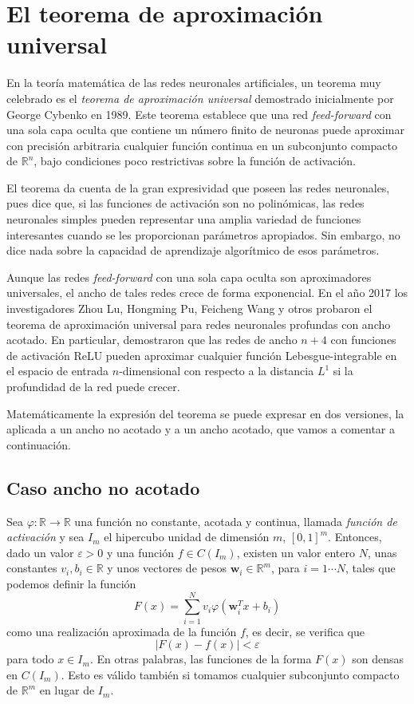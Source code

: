 \documentclass[
  a4paper,
  12pt,
  spanish,
]{scrartcl}
\theoremstyle{teorema-style}
\begin{document}
\section{El teorema de aproximación universal}
\label{sec:teorema}

En la teoría matemática de las redes neuronales artificiales, un teorema muy celebrado es el \textit{teorema de aproximación universal} demostrado inicialmente por George Cybenko en 1989. Este teorema establece que una red \textit{feed-forward} con una sola capa oculta que contiene un número finito de neuronas puede aproximar con precisión arbitraria cualquier función continua en un subconjunto compacto de $\mathbb{R}^n$, bajo condiciones poco restrictivas sobre la función de activación.

El teorema da cuenta de la gran expresividad que poseen las redes neuronales, pues dice que, si las funciones de activación son no polinómicas, las redes neuronales simples pueden representar una amplia variedad de funciones interesantes cuando se les proporcionan parámetros apropiados. Sin embargo, no dice nada sobre la capacidad de aprendizaje algorítmico de esos parámetros.

Aunque las redes \textit{feed-forward} con una sola capa oculta son aproximadores universales, el ancho de tales redes crece de forma exponencial. En el año 2017 los investigadores Zhou Lu, Hongming Pu, Feicheng Wang y otros \parencite{lu_expressive_2017} probaron el teorema de aproximación universal para redes neuronales profundas con ancho acotado. En particular, demostraron que las redes de ancho $n + 4$ con funciones de activación ReLU pueden aproximar cualquier función Lebesgue-integrable en el espacio de entrada $n$-dimensional con respecto a la distancia $L^{1}$ si la profundidad de la red puede crecer.

Matemáticamente la expresión del teorema se puede expresar en dos versiones, la aplicada a un ancho no acotado y a un ancho acotado, que vamos a comentar a continuación.

\subsection{Caso ancho no acotado}

Sea $\varphi:\mathbb{R} \rightarrow \mathbb{R}$ una función no constante, acotada y continua, llamada \textit{función de activación} y sea $I_m$ el hipercubo unidad de dimensión $m$, $[0,1]^m$.
Entonces, dado un valor $\varepsilon > 0$ y una función $f \in C(I_m)$, existen un valor entero $N$, unas constantes $v_i , b_i \in \mathbb{R}$ y unos vectores de pesos $\pmb{w}_i \in \mathbb{R}^m$, para $i =1 \cdots N$, tales que podemos definir la función
\[
  F (x) = \sum_{{i = 1}}^{{N}} v_{i} \varphi \left (\pmb w_ {i} ^ {T} x + b_ {i} \right)
\]
como una realización aproximada de la función $f$, es decir, se verifica que
\[
  |F(x)-f(x)| < \varepsilon
\]
para todo \(x \in I_m\).
En otras palabras, las funciones de la forma $F(x)$ son densas en $C(I_m)$.
Esto es válido también si tomamos cualquier subconjunto compacto de $\mathbb{R}^m$ en lugar de $I_m$.
\end{document}
